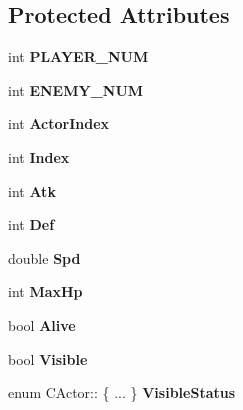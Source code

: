 \subsection*{Protected Attributes}
\begin{DoxyCompactItemize}
\item 
int {\bfseries P\+L\+A\+Y\+E\+R\+\_\+\+N\+UM}\hypertarget{class_c_actor_acaf5a0d56d6d559605c98d2e5d123dac}{}\label{class_c_actor_acaf5a0d56d6d559605c98d2e5d123dac}

\item 
int {\bfseries E\+N\+E\+M\+Y\+\_\+\+N\+UM}\hypertarget{class_c_actor_aad97041a2e44e401c6ab4a44584f8b95}{}\label{class_c_actor_aad97041a2e44e401c6ab4a44584f8b95}

\item 
int {\bfseries Actor\+Index}\hypertarget{class_c_actor_a170ca35b074b3f06b00eb414ce5d3692}{}\label{class_c_actor_a170ca35b074b3f06b00eb414ce5d3692}

\item 
int {\bfseries Index}\hypertarget{class_c_actor_adff20f8fc1557d60af909022ae07143f}{}\label{class_c_actor_adff20f8fc1557d60af909022ae07143f}

\item 
int {\bfseries Atk}\hypertarget{class_c_actor_a38772d20effe55a79298c1f8400b3e4e}{}\label{class_c_actor_a38772d20effe55a79298c1f8400b3e4e}

\item 
int {\bfseries Def}\hypertarget{class_c_actor_aeca99c74c0265ba588ef31bb7615de90}{}\label{class_c_actor_aeca99c74c0265ba588ef31bb7615de90}

\item 
double {\bfseries Spd}\hypertarget{class_c_actor_a086fb19095dfe955b05b00fefb0a9a6f}{}\label{class_c_actor_a086fb19095dfe955b05b00fefb0a9a6f}

\item 
int {\bfseries Max\+Hp}\hypertarget{class_c_actor_ab097e6436e9bc7c885f3a62f8177065f}{}\label{class_c_actor_ab097e6436e9bc7c885f3a62f8177065f}

\item 
bool {\bfseries Alive}\hypertarget{class_c_actor_ac3eca4b5efa2ecb6bedd4e5d30ab993b}{}\label{class_c_actor_ac3eca4b5efa2ecb6bedd4e5d30ab993b}

\item 
bool {\bfseries Visible}\hypertarget{class_c_actor_aa93d950eabf8b1f0b1693adfb7ff9770}{}\label{class_c_actor_aa93d950eabf8b1f0b1693adfb7ff9770}

\item 
enum C\+Actor\+:: \{ ... \}  {\bfseries Visible\+Status}\hypertarget{class_c_actor_a79714be7b20898795e0a2b16a1e78b38}{}\label{class_c_actor_a79714be7b20898795e0a2b16a1e78b38}


\end{DoxyCompactItemize}
